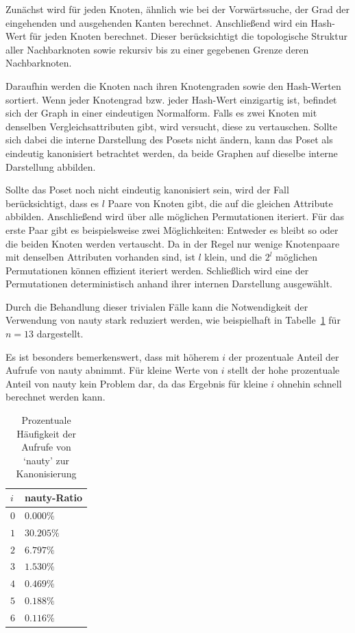 \documentclass[10pt,journal,compsoc]{IEEEtran}
\begin{document}
Zunächst wird für jeden Knoten, ähnlich wie bei der Vorwärtssuche, der Grad der eingehenden und ausgehenden Kanten berechnet.
Anschließend wird ein Hash-Wert für jeden Knoten berechnet.
Dieser berücksichtigt die topologische Struktur aller Nachbarknoten sowie rekursiv bis zu einer gegebenen Grenze deren Nachbarknoten.

Daraufhin werden die Knoten nach ihren Knotengraden sowie den Hash-Werten sortiert.
Wenn jeder Knotengrad bzw. jeder Hash-Wert einzigartig ist, befindet sich der Graph in einer eindeutigen Normalform.
Falls es zwei Knoten mit denselben Vergleichsattributen gibt, wird versucht, diese zu vertauschen.
Sollte sich dabei die interne Darstellung des Posets nicht ändern, kann das Poset als eindeutig kanonisiert betrachtet werden, da beide Graphen auf dieselbe interne Darstellung abbilden.

Sollte das Poset noch nicht eindeutig kanonisiert sein, wird der Fall berücksichtigt, dass es $l$ Paare von Knoten gibt, die auf die gleichen Attribute abbilden.
Anschließend wird über alle möglichen Permutationen iteriert.
Für das erste Paar gibt es beispielsweise zwei Möglichkeiten: Entweder es bleibt so oder die beiden Knoten werden vertauscht.
Da in der Regel nur wenige Knotenpaare mit denselben Attributen vorhanden sind, ist $l$ klein, und die $2^l$ möglichen Permutationen können effizient iteriert werden. Schließlich wird eine der Permutationen deterministisch anhand ihrer internen Darstellung ausgewählt.

Durch die Behandlung dieser trivialen Fälle kann die Notwendigkeit der Verwendung von nauty stark reduziert werden, wie beispielhaft in Tabelle~\ref{table:nauty-ratio} für $n = 13$ dargestellt.

Es ist besonders bemerkenswert, dass mit höherem $i$ der prozentuale Anteil der Aufrufe von nauty abnimmt.
Für kleine Werte von $i$ stellt der hohe prozentuale Anteil von nauty kein Problem dar, da das Ergebnis für kleine $i$ ohnehin schnell berechnet werden kann.

\begin{table}
  \begin{tabular}{l|l}
    $i$ & nauty-Ratio \\
    \hline
    $0$ & $0.000\%$   \\
    $1$ & $30.205\%$  \\
    $2$ & $6.797\%$   \\
    $3$ & $1.530\%$   \\
    $4$ & $0.469\%$   \\
    $5$ & $0.188\%$   \\
    $6$ & $0.116\%$
  \end{tabular}
  \centering
  \caption{Prozentuale Häufigkeit der Aufrufe von `nauty' zur Kanonisierung}
  \label{table:nauty-ratio}
\end{table}
\end{document}
